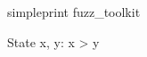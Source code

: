 \documentclass{article}
\begin{document}
\begin{zsection}
\SECTION simpleprint \parents 
			 fuzz\_toolkit
\end{zsection}

\begin{schema}{State}
   x, y: \nat
\where
   x > y
\end{schema}

\end{document}
